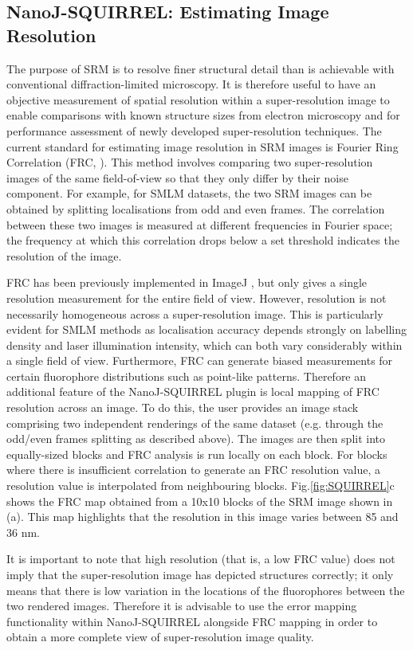 \subsection*{NanoJ-SQUIRREL: Estimating Image Resolution}
The purpose of SRM is to resolve finer structural detail than is achievable with conventional diffraction-limited microscopy. It is therefore useful to have an objective measurement of spatial resolution within a super-resolution image to enable comparisons with known structure sizes from electron microscopy and for performance assessment of newly developed super-resolution techniques. The current standard for estimating image resolution in SRM images is Fourier Ring Correlation (FRC, \cite{nieuwenhuizen2013measuring}). This method involves comparing two super-resolution images of the same field-of-view so that they only differ by their noise component. For example, for SMLM datasets, the two SRM images can be obtained by splitting localisations from odd and even frames. The correlation between these two images is measured at different frequencies in Fourier space; the frequency at which this correlation drops below a set threshold indicates the resolution of the image.

FRC has been previously implemented in ImageJ \cite{nieuwenhuizen2013measuring}, but only gives a single resolution measurement for the entire field of view. However, resolution is not necessarily homogeneous across a super-resolution image. This is particularly evident for SMLM methods as localisation accuracy depends strongly on labelling density and laser illumination intensity, which can both vary considerably within a single field of view. Furthermore, FRC can generate biased measurements for certain fluorophore distributions such as point-like patterns. Therefore an additional feature of the NanoJ-SQUIRREL plugin is local mapping of FRC resolution across an image. To do this, the user provides an image stack comprising two independent renderings of the same dataset (e.g. through the odd/even frames splitting as described above). The images are then split into equally-sized blocks and FRC analysis is run locally on each block. For blocks where there is insufficient correlation to generate an FRC resolution value, a resolution value is interpolated from neighbouring blocks. Fig.\ref{fig:SQUIRREL}c shows the FRC map obtained from a 10x10 blocks of the SRM image shown in (a). This map highlights that the resolution in this image varies between 85 and 36 nm.

It is important to note that high resolution (that is, a low FRC value) does not imply that the super-resolution image has depicted structures correctly; it only means that there is low variation in the locations of the fluorophores between the two rendered images. Therefore it is advisable to use the error mapping functionality within NanoJ-SQUIRREL alongside FRC mapping in order to obtain a more complete view of super-resolution image quality.


